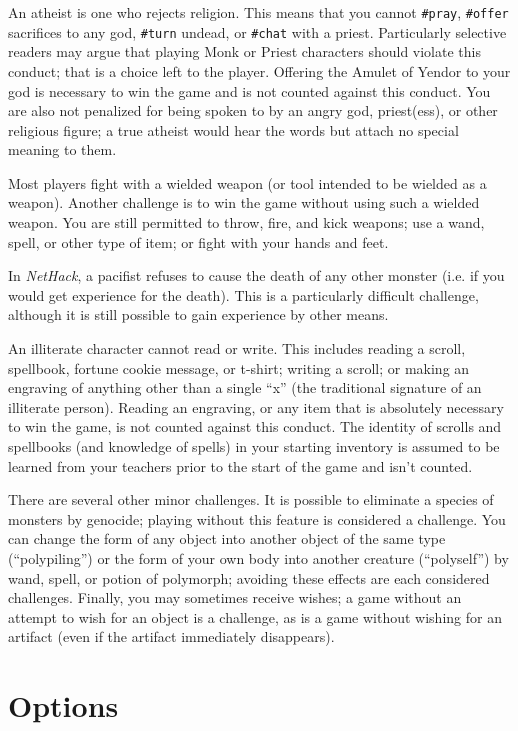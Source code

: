An atheist is one who rejects religion.  This means that you cannot
{\tt \#pray}, {\tt \#offer} sacrifices to any god,
{\tt \#turn} undead, or {\tt \#chat} with a priest.
Particularly selective readers may argue that playing Monk or Priest
characters should violate this conduct; that is a choice left to the
player.  Offering the Amulet of Yendor to your god is necessary to
win the game and is not counted against this conduct.  You are also
not penalized for being spoken to by an angry god, priest(ess), or
other religious figure; a true atheist would hear the words but
attach no special meaning to them.

Most players fight with a wielded weapon (or tool intended to be
wielded as a weapon).  Another challenge is to win the game without
using such a wielded weapon.  You are still permitted to throw,
fire, and kick weapons; use a wand, spell, or other type of item;
or fight with your hands and feet.

In {\it NetHack\/}, a pacifist refuses to cause the death of any other monster
(i.e. if you would get experience for the death).  This is a particularly
difficult challenge, although it is still possible to gain experience
by other means.

An illiterate character cannot read or write.  This includes reading
a scroll, spellbook, fortune cookie message, or t-shirt; writing a
scroll; or making an engraving of anything other than a single ``x'' (the
traditional signature of an illiterate person).  Reading an engraving,
or any item that is absolutely necessary to win the game, is not counted
against this conduct.  The identity of scrolls and spellbooks (and
knowledge of spells) in your starting inventory is assumed to be
learned from your teachers prior to the start of the game and isn't
counted.

There are several other minor challenges.  It is possible to eliminate
a species of monsters by genocide; playing without this feature is
considered a challenge.  You can change the form of any object into
another object of the same type (``polypiling'') or the form of your own
body into another creature (``polyself'') by wand, spell, or potion of
polymorph; avoiding these effects are each considered challenges.
Finally, you may sometimes receive wishes; a game without an attempt to
wish for an object is a challenge, as is a game without wishing for
an artifact (even if the artifact immediately disappears).

\section{Options}

